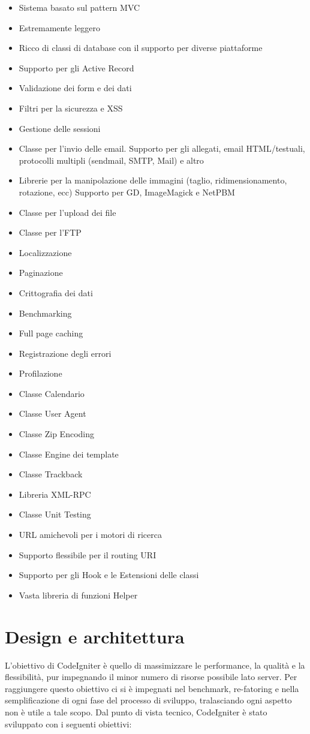 \begin{itemize}
\item Sistema basato sul pattern \ac{MVC}
\item Estremamente leggero
\item Ricco di classi di database con il supporto per diverse piattaforme
\item Supporto per gli Active Record
\item Validazione dei form e dei dati
\item Filtri per la sicurezza e \ac{XSS}
\item Gestione delle sessioni
\item Classe per l'invio delle email. Supporto per gli allegati, email \ac{HTML}/testuali, protocolli multipli (sendmail, \ac{SMTP}, Mail) e altro
\item Librerie per la manipolazione delle immagini (taglio, ridimensionamento, rotazione, ecc) Supporto per \ac{GD}, ImageMagick e NetPBM
\item Classe per l'upload dei file
\item Classe per l'\ac{FTP}
\item Localizzazione
\item Paginazione
\item Crittografia dei dati
\item Benchmarking
\item Full page caching
\item Registrazione degli errori
\item Profilazione
\item Classe Calendario
\item Classe User Agent
\item Classe Zip Encoding
\item Classe Engine dei template
\item Classe Trackback
\item Libreria \ac{XML-RPC}
\item Classe Unit Testing
\item \ac{URL} amichevoli per i motori di ricerca
\item Supporto flessibile per il routing \ac{URI}
\item Supporto per gli Hook e le Estensioni delle classi
\item Vasta libreria di funzioni Helper
\end{itemize}

\section{Design e architettura}
L'obiettivo di CodeIgniter è quello di massimizzare le performance, la qualità e la flessibilità, pur impegnando il minor numero di risorse possibile lato server. Per raggiungere questo obiettivo ci si è impegnati nel benchmark, re-fatoring e nella semplificazione di ogni fase del processo di sviluppo, tralasciando ogni aspetto non è utile a tale scopo. Dal punto di vista tecnico, CodeIgniter è stato sviluppato con i seguenti obiettivi:

